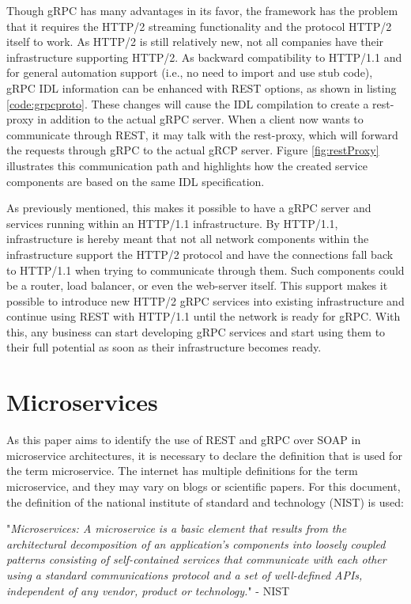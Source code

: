 \documentclass[conference]{IEEEtran}
\begin{document}
Though gRPC has many advantages in its favor, the framework has the problem that it requires the HTTP/2 streaming functionality and the protocol HTTP/2 itself to work. As HTTP/2 is still relatively new, not all companies have their infrastructure supporting HTTP/2. As backward compatibility to HTTP/1.1 and for general automation support (i.e., no need to import and use stub code), gRPC IDL information can be enhanced with REST options, as shown in listing \ref{code:grpcproto}. These changes will cause the IDL compilation to create a rest-proxy in addition to the actual gRPC server. When a client now wants to communicate through REST, it may talk with the rest-proxy, which will forward the requests through gRPC to the actual gRCP server. Figure \ref{fig:restProxy} illustrates this communication path and highlights how the created service components are based on the same IDL specification.

As previously mentioned, this makes it possible to have a gRPC server and services running within an HTTP/1.1 infrastructure. By HTTP/1.1, infrastructure is hereby meant that not all network components within the infrastructure support the HTTP/2 protocol and have the connections fall back to HTTP/1.1 when trying to communicate through them. Such components could be a router, load balancer, or even the web-server itself. This support makes it possible to introduce new HTTP/2 gRPC services into existing infrastructure and continue using REST with HTTP/1.1 until the network is ready for gRPC. With this, any business can start developing gRPC services and start using them to their full potential as soon as their infrastructure becomes ready.

\section{Microservices}
\label{sec:micros}

As this paper aims to identify the use of REST and gRPC over SOAP in microservice architectures, it is necessary to declare the definition that is used for the term microservice. The internet has multiple definitions for the term microservice, and they may vary on blogs or scientific papers. For this document, the definition of the national institute of standard and technology (NIST) is used:

"\emph{Microservices: A microservice is a basic element that results from the architectural decomposition of an application's components into loosely coupled patterns consisting of self-contained services that communicate with each other using a standard communications protocol and a set of well-defined APIs, independent of any vendor, product or technology.}" - NIST \cite{karmel2016nist}
\end{document}
